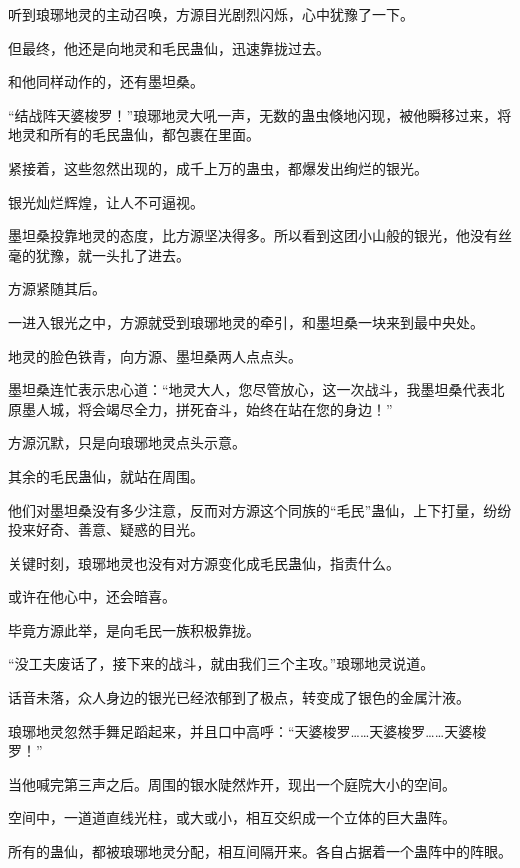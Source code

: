 
\begin{this_body}



听到琅琊地灵的主动召唤，方源目光剧烈闪烁，心中犹豫了一下。

但最终，他还是向地灵和毛民蛊仙，迅速靠拢过去。

和他同样动作的，还有墨坦桑。

“结战阵天婆梭罗！”琅琊地灵大吼一声，无数的蛊虫倏地闪现，被他瞬移过来，将地灵和所有的毛民蛊仙，都包裹在里面。

紧接着，这些忽然出现的，成千上万的蛊虫，都爆发出绚烂的银光。

银光灿烂辉煌，让人不可逼视。

墨坦桑投靠地灵的态度，比方源坚决得多。所以看到这团小山般的银光，他没有丝毫的犹豫，就一头扎了进去。

方源紧随其后。

一进入银光之中，方源就受到琅琊地灵的牵引，和墨坦桑一块来到最中央处。

地灵的脸色铁青，向方源、墨坦桑两人点点头。

墨坦桑连忙表示忠心道：“地灵大人，您尽管放心，这一次战斗，我墨坦桑代表北原墨人城，将会竭尽全力，拼死奋斗，始终在站在您的身边！”

方源沉默，只是向琅琊地灵点头示意。

其余的毛民蛊仙，就站在周围。

他们对墨坦桑没有多少注意，反而对方源这个同族的“毛民”蛊仙，上下打量，纷纷投来好奇、善意、疑惑的目光。

关键时刻，琅琊地灵也没有对方源变化成毛民蛊仙，指责什么。

或许在他心中，还会暗喜。

毕竟方源此举，是向毛民一族积极靠拢。

“没工夫废话了，接下来的战斗，就由我们三个主攻。”琅琊地灵说道。

话音未落，众人身边的银光已经浓郁到了极点，转变成了银色的金属汁液。

琅琊地灵忽然手舞足蹈起来，并且口中高呼：“天婆梭罗……天婆梭罗……天婆梭罗！”

当他喊完第三声之后。周围的银水陡然炸开，现出一个庭院大小的空间。

空间中，一道道直线光柱，或大或小，相互交织成一个立体的巨大蛊阵。

所有的蛊仙，都被琅琊地灵分配，相互间隔开来。各自占据着一个蛊阵中的阵眼。


\end{this_body}
